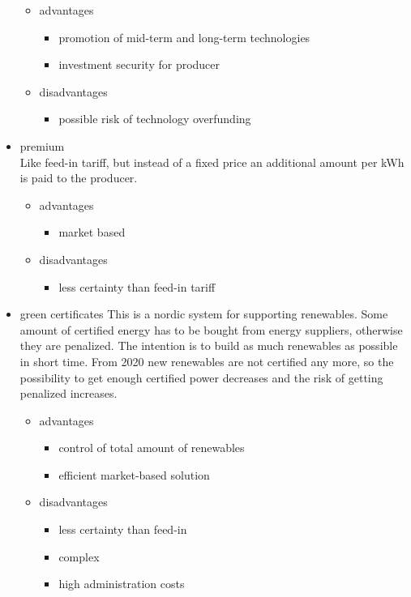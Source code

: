 \documentclass{article}
\begin{document}
\begin{itemize}
\begin{itemize}
\item advantages
\begin{itemize}
\item promotion of mid-term and long-term technologies
\item investment security for producer
\end{itemize}
\item disadvantages
\begin{itemize}
\item possible risk of technology overfunding
\end{itemize}
\end{itemize}
\item premium\\
Like feed-in tariff, but instead of a fixed price an additional amount per kWh is paid to the producer.
\begin{itemize}
\item advantages
\begin{itemize}
\item market based
\end{itemize}
\item disadvantages
\begin{itemize}
\item less certainty than feed-in tariff
\end{itemize}
\end{itemize}
\item green certificates
This is a nordic system for supporting renewables. Some amount of certified energy has to be bought from energy suppliers, otherwise they are penalized. The intention is to build as much renewables as possible in short time. From 2020 new renewables are not certified any more, so the possibility to get enough certified power decreases and the risk of getting penalized increases.
\begin{itemize}
\item advantages
\begin{itemize}
\item control of total amount of renewables
\item efficient market-based solution
\end{itemize}
\item disadvantages
\begin{itemize}
\item less certainty than feed-in
\item complex
\item high administration costs
\end{itemize}
\end{itemize}
\end{itemize}
\end{document}
